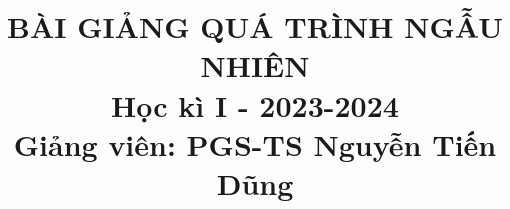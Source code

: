 \documentclass[11pt,vietnamese,BCOR8mm, most, usenames, dvipsnames, a4papers]{book}
\begin{document}
\title{
    \textbf{BÀI GIẢNG QUÁ TRÌNH NGẪU NHIÊN}\\
    Học kì I - 2023-2024\\
    Giảng viên: PGS-TS Nguyễn Tiến Dũng
}
\maketitle
\tableofcontents{}






\end{document}
